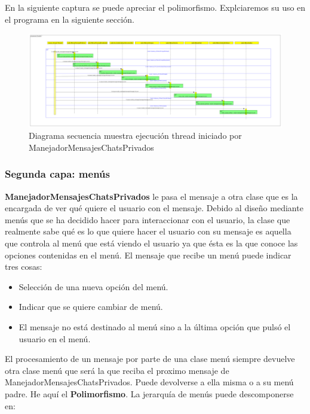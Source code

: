 En la siguiente captura se puede apreciar el polimorfismo. Explciaremos su uso en el programa en la siguiente sección.

\begin{figure}[H] %
\centering
\includegraphics[scale=0.13]{imagenes/diagramas/secuencia/grandes/ejecutar_thread.png}  %

\caption{Diagrama secuencia muestra ejecución thread iniciado por ManejadorMensajesChatsPrivados }\label{figura223}
\end{figure}
\subsubsection*{Segunda capa: menús}


\textbf{ManejadorMensajesChatsPrivados} le pasa el mensaje a otra clase que es la encargada de ver qué quiere el usuario con el mensaje. 
 Debido al diseño mediante menús que se ha decidido hacer  para interaccionar con el usuario, la clase que realmente sabe qué es lo que quiere hacer el usuario con su mensaje es aquella que controla al menú que está viendo el usuario ya que ésta es la que conoce las opciones contenidas en el menú. El mensaje que recibe un menú puede indicar tres cosas:
\begin{itemize}
\item Selección de una nueva opción del menú.
\item Indicar que se quiere cambiar de menú.
\item El mensaje no está destinado al menú sino a la última opción que pulsó el usuario en el menú.
\end{itemize} 
 
 El procesamiento de un mensaje por parte de una clase menú siempre devuelve otra clase menú que será la que reciba el proximo mensaje de ManejadorMensajesChatsPrivados. Puede devolverse a ella misma o a su menú padre. He aquí el \textbf{Polimorfismo}.
 La jerarquía de menús puede descomponerse en:
 
